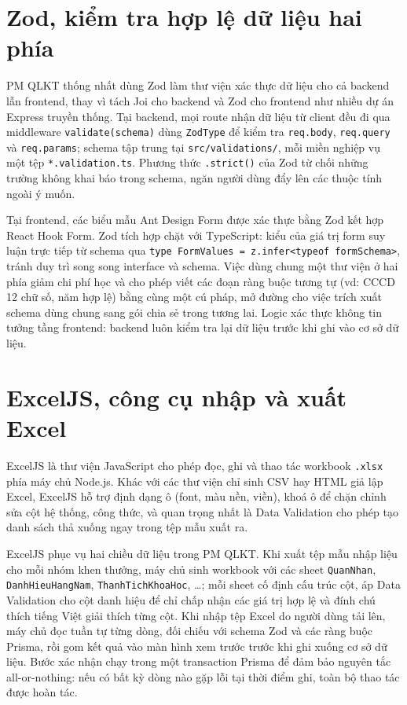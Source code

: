\documentclass[../DoAn.tex]{subfiles}
\begin{document}
\section{Zod, kiểm tra hợp lệ dữ liệu hai phía}
\label{section:3.7}

PM QLKT thống nhất dùng Zod \cite{zoddocs} làm thư viện xác thực dữ liệu cho cả backend lẫn frontend, thay vì tách Joi cho backend và Zod cho frontend như nhiều dự án Express truyền thống. Tại backend, mọi route nhận dữ liệu từ client đều đi qua middleware \texttt{validate(schema)} dùng \texttt{ZodType} để kiểm tra \texttt{req.body}, \texttt{req.query} và \texttt{req.params}; schema tập trung tại \texttt{src/validations/}, mỗi miền nghiệp vụ một tệp \texttt{*.validation.ts}. Phương thức \texttt{.strict()} của Zod từ chối những trường không khai báo trong schema, ngăn người dùng đẩy lên các thuộc tính ngoài ý muốn.

Tại frontend, các biểu mẫu Ant Design Form được xác thực bằng Zod kết hợp React Hook Form. Zod tích hợp chặt với TypeScript: kiểu của giá trị form suy luận trực tiếp từ schema qua \texttt{type FormValues = z.infer<typeof formSchema>}, tránh duy trì song song interface và schema. Việc dùng chung một thư viện ở hai phía giảm chi phí học và cho phép viết các đoạn ràng buộc tương tự (vd: CCCD 12 chữ số, năm hợp lệ) bằng cùng một cú pháp, mở đường cho việc trích xuất schema dùng chung sang gói chia sẻ trong tương lai. Logic xác thực không tin tưởng tầng frontend: backend luôn kiểm tra lại dữ liệu trước khi ghi vào cơ sở dữ liệu.

\section{ExcelJS, công cụ nhập và xuất Excel}
\label{section:3.8}

ExcelJS \cite{exceljsdocs} là thư viện JavaScript cho phép đọc, ghi và thao tác workbook \texttt{.xlsx} phía máy chủ Node.js. Khác với các thư viện chỉ sinh CSV hay HTML giả lập Excel, ExcelJS hỗ trợ định dạng ô (font, màu nền, viền), khoá ô để chặn chỉnh sửa cột hệ thống, công thức, và quan trọng nhất là Data Validation cho phép tạo danh sách thả xuống ngay trong tệp mẫu xuất ra.

ExcelJS phục vụ hai chiều dữ liệu trong PM QLKT. Khi xuất tệp mẫu nhập liệu cho mỗi nhóm khen thưởng, máy chủ sinh workbook với các sheet \texttt{QuanNhan}, \texttt{DanhHieuHangNam}, \texttt{ThanhTichKhoaHoc}, \dots; mỗi sheet cố định cấu trúc cột, áp Data Validation cho cột danh hiệu để chỉ chấp nhận các giá trị hợp lệ và đính chú thích tiếng Việt giải thích từng cột. Khi nhập tệp Excel do người dùng tải lên, máy chủ đọc tuần tự từng dòng, đối chiếu với schema Zod và các ràng buộc Prisma, rồi gom kết quả vào màn hình xem trước trước khi ghi xuống cơ sở dữ liệu. Bước xác nhận chạy trong một transaction Prisma để đảm bảo nguyên tắc all-or-nothing: nếu có bất kỳ dòng nào gặp lỗi tại thời điểm ghi, toàn bộ thao tác được hoàn tác.
\end{document}
